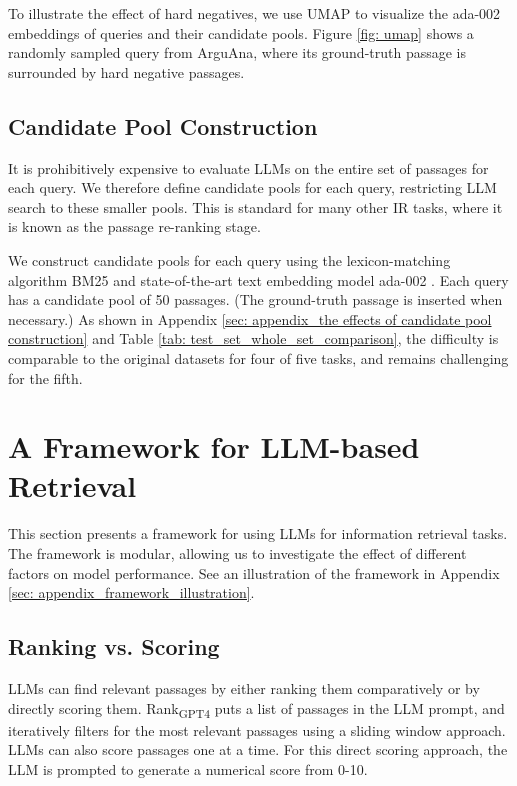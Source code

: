 \documentclass[11pt]{article}
\begin{document}
To illustrate the effect of hard negatives, we use UMAP \cite{UMAP} to visualize the ada-002 embeddings of queries and their candidate pools. Figure \ref{fig: umap} shows a randomly sampled query from ArguAna, where its ground-truth passage is surrounded by hard negative passages.


\subsection{Candidate Pool Construction}

It is prohibitively expensive to evaluate LLMs on the entire set of passages for each query. We therefore define candidate pools for each query, restricting LLM search to these smaller pools. This is standard for many other IR tasks, where it is known as the passage re-ranking stage.

We construct candidate pools for each query using the lexicon-matching algorithm BM25 \cite{bm25_2, bm25} and state-of-the-art text embedding model ada-002 \cite{ada}. Each query has a candidate pool of 50 passages. (The ground-truth passage is inserted when necessary.) As shown in Appendix \ref{sec: appendix_the effects of candidate pool construction} and Table \ref{tab: test_set_whole_set_comparison}, the difficulty is comparable to the original datasets for four of five tasks, and remains challenging for the fifth. 

\section{A Framework for LLM-based Retrieval}
\label{sec: llm-framework}


This section presents a framework for using LLMs for information retrieval tasks. The framework is modular, allowing us to investigate the effect of different factors on model performance. See an illustration of the framework in Appendix \ref{sec: appendix_framework_illustration}.


\subsection{Ranking vs. Scoring}

LLMs can find relevant passages by either ranking them comparatively or by directly scoring them. Rank\textsubscript{\scriptsize{GPT4}} \cite{rankgpt} puts a list of passages in the LLM prompt, and iteratively filters for the most relevant passages using a sliding window approach. LLMs can also score passages one at a time. For this direct scoring approach, the LLM is prompted to generate a numerical score from 0-10.
\end{document}
